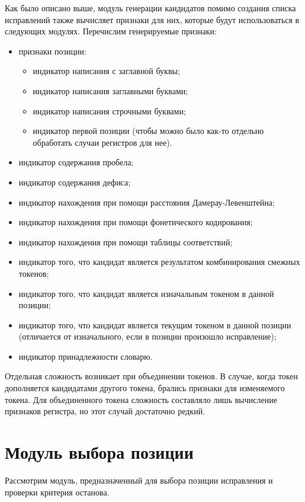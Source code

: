 Как было описано выше, модуль генерации кандидатов помимо создания списка исправлений также вычисляет признаки для них, которые будут использоваться в следующих модулях. Перечислим генерируемые признаки:
\begin{itemize}
	\item признаки позиции:
	\begin{itemize}
		\item индикатор написания с заглавной буквы;
		\item индикатор написания заглавными буквами;
		\item индикатор написания строчными буквами;
		\item индикатор первой позиции (чтобы можно было как-то отдельно обработать случаи регистров для нее).
	\end{itemize}
	\item индикатор содержания пробела;
	\item индикатор содержания дефиса;
	\item индикатор нахождения при помощи расстояния Дамерау-Левенштейна;
	\item индикатор нахождения при помощи фонетического кодирования;
	\item индикатор нахождения при помощи таблицы соответствий;
	\item индикатор того, что кандидат является результатом комбинирования смежных токенов;
	\item индикатор того, что кандидат является изначальным токеном в данной позиции;
	\item индикатор того, что кандидат является текущим токеном в данной позиции (отличается от изначального, если в позиции произошло исправление);
	\item индикатор принадлежности словарю.
\end{itemize}

Отдельная сложность возникает при объединении токенов. В случае, когда токен дополняется кандидатами другого токена, брались признаки для изменяемого токена. Для объединенного токена сложность составляло лишь вычисление признаков регистра, но этот случай достаточно редкий.

\section{Модуль выбора позиции}

Рассмотрим модуль, предназначенный для выбора позиции исправления и проверки критерия останова.


